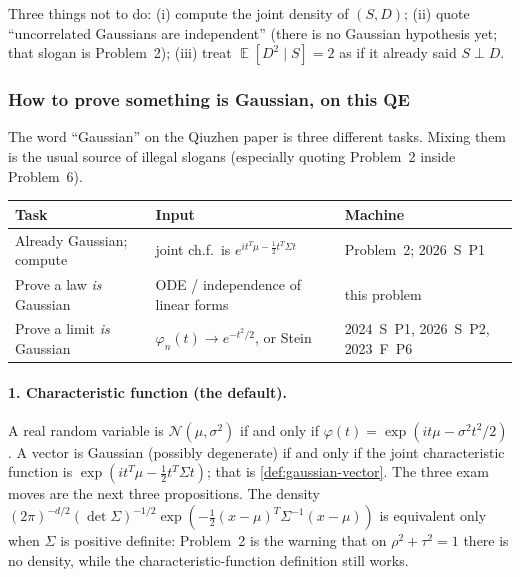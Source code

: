 \documentclass[11pt,a4paper]{article}
\DeclareMathOperator{\E}{\mathbb{E}}
\begin{document}
Three things not to do: (i) compute the joint density of \( (S,D) \); (ii) quote ``uncorrelated Gaussians are independent'' (there is no Gaussian hypothesis yet; that slogan is Problem~2); (iii) treat \( \E[D^{2}\mid S]=2 \) as if it already said \( S\perp D \).

\subsubsection{How to prove something is Gaussian, on this QE}

The word ``Gaussian'' on the Qiuzhen paper is three different tasks. Mixing them is the usual source of illegal slogans (especially quoting Problem~2 inside Problem~6).

\begin{center}
\renewcommand{\arraystretch}{1.25}
\small
\begin{tabular}{@{}lll@{}}
\toprule
Task & Input & Machine \\
\midrule
Already Gaussian; compute & joint ch.f.\ is \( e^{it^{T}\mu-\frac12 t^{T}\Sigma t} \) & Problem~2; 2026~S~P1 \\
Prove a law \emph{is} Gaussian & ODE / independence of linear forms & this problem \\
Prove a limit \emph{is} Gaussian & \( \varphi_n(t)\to e^{-t^{2}/2} \), or Stein & 2024~S~P1, 2026~S~P2, 2023~F~P6 \\
\bottomrule
\end{tabular}
\end{center}

\paragraph{1. Characteristic function (the default).}

A real random variable is \( \mathcal{N}(\mu,\sigma^{2}) \) if and only if \( \varphi(t)=\exp(it\mu-\sigma^{2}t^{2}/2) \). A vector is Gaussian (possibly degenerate) if and only if the joint characteristic function is \( \exp(it^{T}\mu-\frac12 t^{T}\Sigma t) \); that is \cref{def:gaussian-vector}. The three exam moves are the next three propositions. The density \( (2\pi)^{-d/2}(\det\Sigma)^{-1/2}\exp(-\frac12(x-\mu)^{T}\Sigma^{-1}(x-\mu)) \) is equivalent only when \( \Sigma \) is positive definite: Problem~2 is the warning that on \( \rho^{2}+\tau^{2}=1 \) there is no density, while the characteristic-function definition still works.
\end{document}
